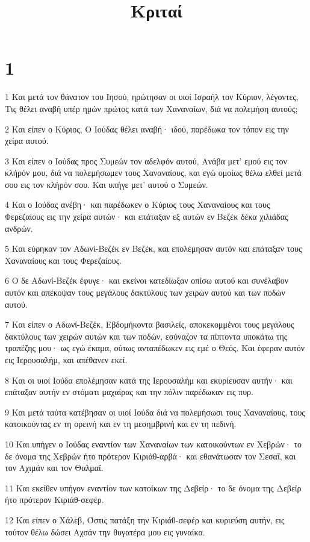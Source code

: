 

\title{Κριταί}


\chapter{1}

\par 1 Και μετά τον θάνατον του Ιησού, ηρώτησαν οι υιοί Ισραήλ τον Κύριον, λέγοντες, Τις θέλει αναβή υπέρ ημών πρώτος κατά των Χαναναίων, διά να πολεμήση αυτούς;
\par 2 Και είπεν ο Κύριος, Ο Ιούδας θέλει αναβή· ιδού, παρέδωκα τον τόπον εις την χείρα αυτού.
\par 3 Και είπεν ο Ιούδας προς Συμεών τον αδελφόν αυτού, Ανάβα μετ' εμού εις τον κλήρόν μου, διά να πολεμήσωμεν τους Χαναναίους, και εγώ ομοίως θέλω ελθεί μετά σου εις τον κλήρόν σου. Και υπήγε μετ' αυτού ο Συμεών.
\par 4 Και ο Ιούδας ανέβη· και παρέδωκεν ο Κύριος τους Χαναναίους και τους Φερεζαίους εις την χείρα αυτών· και επάταξαν εξ αυτών εν Βεζέκ δέκα χιλιάδας ανδρών.
\par 5 Και εύρηκαν τον Αδωνί-Βεζέκ εν Βεζέκ, και επολέμησαν αυτόν και επάταξαν τους Χαναναίους και τους Φερεζαίους.
\par 6 Ο δε Αδωνί-Βεζέκ έφυγε· και εκείνοι κατεδίωξαν οπίσω αυτού και συνέλαβον αυτόν και απέκοψαν τους μεγάλους δακτύλους των χειρών αυτού και των ποδών αυτού.
\par 7 Και είπεν ο Αδωνί-Βεζέκ, Εβδομήκοντα βασιλείς, αποκεκομμένοι τους μεγάλους δακτύλους των χειρών αυτών και των ποδών, εσύναζον τα πίπτοντα υποκάτω της τραπέζης μου· ως εγώ έκαμα, ούτως ανταπέδωκεν εις εμέ ο Θεός. Και έφεραν αυτόν εις Ιερουσαλήμ, και απέθανεν εκεί.
\par 8 Και οι υιοί Ιούδα επολέμησαν κατά της Ιερουσαλήμ και εκυρίευσαν αυτήν· και επάταξαν αυτήν εν στόματι μαχαίρας και την πόλιν παρέδωκαν εις πυρ.
\par 9 Και μετά ταύτα κατέβησαν οι υιοί Ιούδα διά να πολεμήσωσι τους Χαναναίους, τους κατοικούντας εν τη ορεινή και εν τη μεσημβρινή και εν τη πεδινή.
\par 10 Και υπήγεν ο Ιούδας εναντίον των Χαναναίων των κατοικούντων εν Χεβρών· το δε όνομα της Χεβρών ήτο πρότερον Κιριάθ-αρβά· και εθανάτωσαν τον Σεσαΐ, και τον Αχιμάν και τον Θαλμαΐ.
\par 11 Και εκείθεν υπήγον εναντίον των κατοίκων της Δεβείρ· το δε όνομα της Δεβείρ ήτο πρότερον Κιριάθ-σεφέρ.
\par 12 Και είπεν ο Χάλεβ, Όστις πατάξη την Κιριάθ-σεφέρ και κυριεύση αυτήν, εις τούτον θέλω δώσει Αχσάν την θυγατέρα μου εις γυναίκα.
